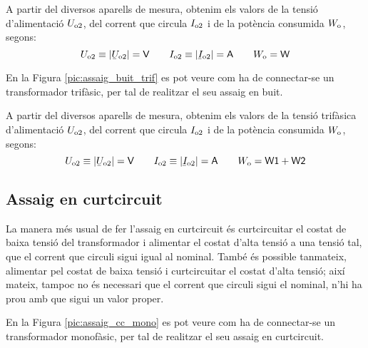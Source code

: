 A partir del diversos aparells de mesura, obtenim els valors de la
tensió d'alimentació $U_\mathrm{o2}$, del corrent que circula
$I_\mathrm{o2}$ i de la potència consumida $W_\mathrm{o}$, segons:
\begin{equation}
    U\ped{o2}\equiv|\cmplx{U}\ped{o2}|=\textsf{V} \qquad
    I\ped{o2}\equiv|\cmplx{I}\ped{o2}|=\textsf{A}
    \qquad W\ped{o}=\textsf{W}
\end{equation}

En la Figura \vref{pic:assaig_buit_trif} es pot veure com ha de
connectar-se un transformador trifàsic, per tal de realitzar el seu
assaig en buit.

\begin{center}
    
    \label{pic:assaig_buit_trif}
\end{center}


A partir del diversos aparells de mesura, obtenim els valors de la
tensió trifàsica d'alimentació $U_\mathrm{o2}$, del corrent que circula
$I_\mathrm{o2}$ i de la potència consumida $W_\mathrm{o}$, segons:
\begin{equation}
    U\ped{o2}\equiv|\cmplx{U}\ped{o2}|=\textsf{V} \qquad
    I\ped{o2}\equiv|\cmplx{I}\ped{o2}|=\textsf{A} \qquad
    W\ped{o}=\textsf{W1}+\textsf{W2}
\end{equation}

\subsection{Assaig en curtcircuit}

La manera més usual de fer l'assaig en curtcircuit és
curtcircuitar el costat de baixa tensió del transformador i
alimentar el costat d'alta tensió a  una tensió tal, que el corrent
que circuli sigui igual al nominal. També és possible tanmateix,
alimentar pel costat de baixa tensió i curtcircuitar el costat
d'alta tensió; així mateix, tampoc no és necessari que el corrent
que circuli sigui el nominal, n'hi ha prou amb que sigui un valor proper.

En la Figura \vref{pic:assaig_cc_mono} es pot veure com ha de
connectar-se un transformador monofàsic, per tal de realitzar el seu
assaig en curtcircuit.

\begin{center}
    
    \label{pic:assaig_cc_mono} \
\end{center}


